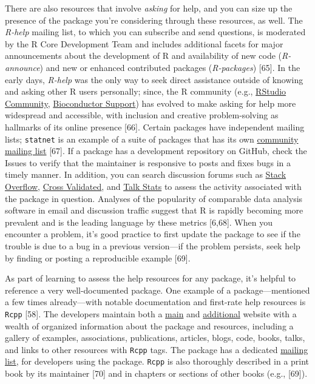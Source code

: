 \documentclass[10pt,letterpaper]{article}
\begin{document}
There are also resources that involve \emph{asking} for help, and you
can size up the presence of the package you're considering through these
resources, as well. The \emph{R-help} mailing list, to which you can
subscribe and send questions, is moderated by the R Core Development
Team and includes additional facets for major announcements about the
development of R and availability of new code (\emph{R-announce}) and
new or enhanced contributed packages (\emph{R-packages}) {[}65{]}. In
the early days, \emph{R-help} was the only way to seek direct assistance
outside of knowing and asking other R users personally; since, the R
community (e.g., \href{https://community.rstudio.com/}{RStudio
Community}, \href{https://support.bioconductor.org/}{Bioconductor
Support}) has evolved to make asking for help more widespread and
accessible, with inclusion and creative problem-solving as hallmarks of
its online presence {[}66{]}. Certain packages have independent mailing
lists; \texttt{statnet} is an example of a suite of packages that has
its own \href{http://statnet.org/}{community mailing list} {[}67{]}. If
a package has a development repository on GitHub, check the Issues to
verify that the maintainer is responsive to posts and fixes bugs in a
timely manner. In addition, you can search discussion forums such as
\href{https://stackoverflow.com/}{Stack Overflow},
\href{https://stats.stackexchange.com/}{Cross Validated}, and
\href{http://www.talkstats.com/}{Talk Stats} to assess the activity
associated with the package in question. Analyses of the popularity of
comparable data analysis software in email and discussion traffic
suggest that R is rapidly becoming more prevalent and is the leading
language by these metrics {[}6,68{]}. When you encounter a problem, it's
good practice to first update the package to see if the trouble is due
to a bug in a previous version---if the problem persists, seek help by
finding or posting a reproducible example {[}69{]}.

As part of learning to assess the help resources for any package, it's
helpful to reference a very well-documented package. One example of a
package---mentioned a few times already---with notable documentation and
first-rate help resources is \texttt{Rcpp} {[}58{]}. The developers
maintain both a \href{http://www.rcpp.org/}{main} and
\href{http://dirk.eddelbuettel.com/code/rcpp.html}{additional} website
with a wealth of organized information about the package and resources,
including a gallery of examples, associations, publications, articles,
blogs, code, books, talks, and links to other resources with
\texttt{Rcpp} tags. The package has a dedicated
\href{https://lists.r-forge.r-project.org/cgi-bin/mailman/listinfo/rcpp-devel}{mailing
list}, for developers using the package. \texttt{Rcpp} is also
thoroughly described in a print book by its maintainer {[}70{]} and in
chapters or sections of other books (e.g., {[}69{]}).
\end{document}
